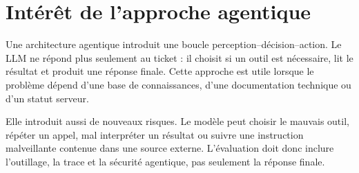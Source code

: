 \section{Intérêt de l'approche agentique}

Une architecture agentique introduit une boucle perception--décision--action.
Le LLM ne répond plus seulement au ticket : il choisit si un outil est
nécessaire, lit le résultat et produit une réponse finale. Cette approche est
utile lorsque le problème dépend d'une base de connaissances, d'une
documentation technique ou d'un statut serveur.

Elle introduit aussi de nouveaux risques. Le modèle peut choisir le mauvais
outil, répéter un appel, mal interpréter un résultat ou suivre une instruction
malveillante contenue dans une source externe. L'évaluation doit donc inclure
l'outillage, la trace et la sécurité agentique, pas seulement la réponse finale.

